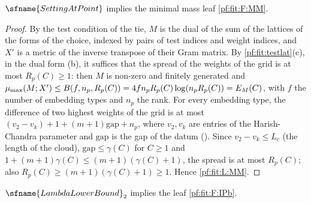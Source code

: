 \begin{lemma}\label{pf:fit:leafmm}
$\sfname{SettingAtPoint}$ implies the minimal mass leaf \ref{pf:fit:F:MM}.
\end{lemma}

\begin{proof}
By the test condition of the tie, $M$ is the dual of the sum of the lattices of the forms of the choice, indexed by pairs of
test indices and weight indices, and $X'$ is a metric of the inverse transpose of their Gram matrix. By
\cref{pf:fit:testlat}(c), in the dual form (b), it suffices that the spread of the weights of the grid is at most $R_p(C)\ge1$:
then $M$ is non-zero and finitely generated and $\mu_{\max}(M;X')\le B(f,n_p,R_p(C))=4fn_pR_p(C)\log(n_pR_p(C))=E_M(C)$, with
$f$ the number of embedding types and $n_p$ the rank. For every embedding type, the difference of two highest weights of the grid is at
most $(v_2-v_k)+1+(m+1)\mathrm{gap}+n_p$, where $v_2,v_k$ are entries of the Harish-Chandra parameter and $\mathrm{gap}$ is
the gap of the datum (). Since $v_2-v_k\le L_c$ (the length of the
cloud), $\mathrm{gap}\le\gamma(C)$ for $C\ge1$ and $1+(m+1)\gamma(C)\le(m+1)(\gamma(C)+1)$, the spread is at most $R_p(C)$;
also $R_p(C)\ge(m+1)(\gamma(C)+1)\ge1$. Hence \ref{pf:fit:L:MM}.
\end{proof}

\begin{lemma}\label{pf:fit:leafipb}
$\sfname{LambdaLowerBound}_2$ implies the leaf \ref{pf:fit:F:IPb}.
\end{lemma}

